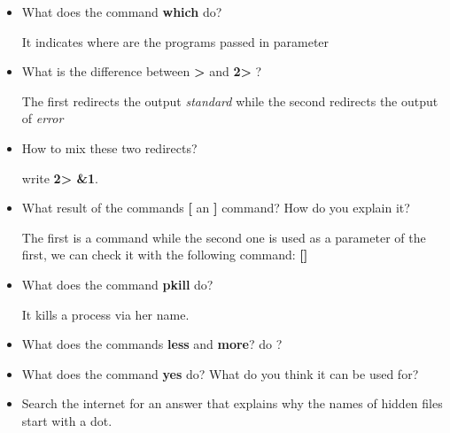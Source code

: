\documentclass[11pt]{article}
\begin{document}
\begin{itemize}
	\item What does the command \textbf{which} do?
	\begin{solution}
		It indicates where are the programs passed in parameter
	\end{solution}
	\item What is the difference between \textbf{>} and \textbf{2>} ?
	\begin{solution}
		The first redirects the output \textit{standard} while the second redirects the output of \textit{error}
	\end{solution}
	\item How to mix these two redirects?
	\begin{solution}
		write \textbf{2> \&1}.
	\end{solution}
	\item What result of the commands \textbf{[} an \textbf{]} command? How do you explain it?
	\begin{solution}
		The first is a command while the second one is used as a parameter of the first, we can check it with the following command: \textbf{[]}
	\end{solution}
	\item What does the command \textbf{pkill} do?
	\begin{solution}
		It kills a process via her name.
	\end{solution}
	\item What does the commands \textbf{less} and \textbf {more}? do ?
	\item What does the command \textbf{yes} do? What do you think it can be used for?
	\item Search the internet for an answer that explains why the names of hidden files start with a dot.
	
\end{itemize}
\end{document}
